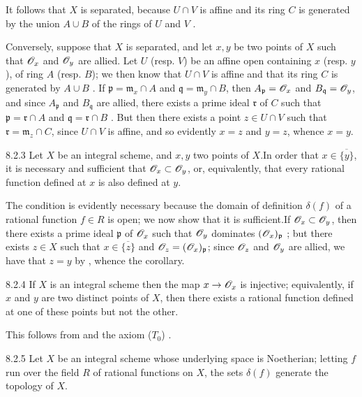 It follows that $X$ is separated, because $U\cap V$ is affine and its ring $C$
is generated by the union $A\cup B$ of the rings of $U$ and $V$ .

Conversely, suppose that $X$ is separated, and let $x,y$ be two points of $X$
such that $\mathscr{O}_x$ and $\mathscr{O}_y$ are allied. Let $U$ (resp. $V$) be an affine open
containing $x$ (resp. $y$), of ring $A$ (resp. $B$); we then know that $U\cap V$
is affine and that its ring $C$ is generated by $A\cup B$ . If
$\mathfrak{p}=\mathfrak{m}_x\cap A$ and $\mathfrak{q}=\mathfrak{m}_y\cap B$,
then $A_\mathfrak{p}=\mathscr{O}_x$ and $B_\mathfrak{q}=\mathscr{O}_y$, and since $A_\mathfrak{p}$
and $B_\mathfrak{q}$ are allied, there exists a prime ideal $\mathfrak{r}$ of
$C$ such that $\mathfrak{p}=\mathfrak{r}\cap A$ and
$\mathfrak{q}=\mathfrak{r}\cap B$ . But then there exists a point
$z\in U\cap V$ such that $\mathfrak{r}=\mathfrak{m}_z\cap C$, since $U\cap V$ is
affine, and so evidently $x=z$ and $y=z$, whence $x=y$.

\begin{envs}[Corollary]{8.2.3}
\label{cor-1.8.2.3}
Let $X$ be an integral scheme, and $x,y$ two
points of $X$.In order that $x\in\overline{\{y\}}$, it is necessary and
sufficient that $\mathscr{O}_x\subset\mathscr{O}_y$, or, equivalently, that every rational
function defined at $x$ is also defined at $y$.
\end{envs}

The condition is evidently necessary because the domain of definition
$\delta(f)$ of a rational function $f\in R$ is open; we now show that it is
sufficient.If $\mathscr{O}_x\subset\mathscr{O}_y$, then there exists a prime ideal
$\mathfrak{p}$ of $\mathscr{O}_x$ such that $\mathscr{O}_y$ dominates $(\mathscr{O}_x)_\mathfrak{p}$
; but  there exists $z\in X$ such that
$x\in\overline{\{z\}}$ and $\mathscr{O}_z=(\mathscr{O}_x)_\mathfrak{p}$; since $\mathscr{O}_z$ and $\mathscr{O}_y$
are allied, we have that $z=y$ by , whence the corollary.

\begin{envs}[Corollary]{8.2.4}
\label{cor-1.8.2.4}
If $X$ is an integral scheme then the map
$x\to\mathscr{O}_x$ is injective; equivalently, if $x$ and $y$ are two distinct points of
$X$, then there exists a rational function defined at one of these points but
not the other.
\end{envs}

This follows from  and the axiom ($T_0$) .

\begin{envs}[Corollary]{8.2.5}
\label{cor-1.8.2.5}
Let $X$ be an integral scheme whose underlying
space is Noetherian; letting $f$ run over the field $R$ of rational functions on
$X$, the sets $\delta(f)$ generate the topology of $X$.
\end{envs}

